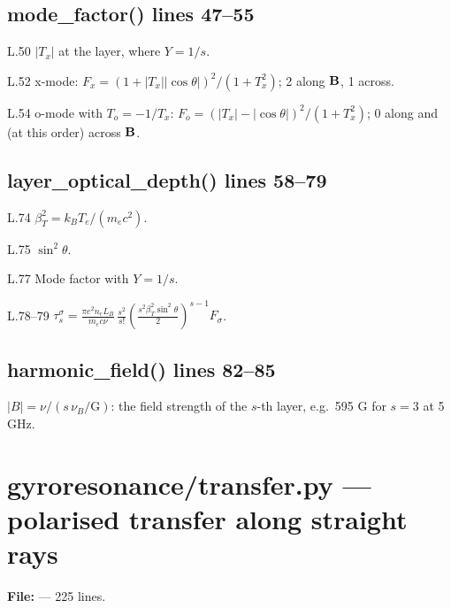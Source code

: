 \section*{\normalsize mode\_factor() \hfill{\small\mdseries\color{gray}lines 47--55}}

\begin{lines}
\item[L.50] $|T_x|$ at the layer, where $Y=1/s$.
\item[L.52] x-mode: $F_x=(1+|T_x||\cos\theta|)^2/(1+T_x^2)$; 2 along $\mathbf{B}$, 1 across.
\item[L.54] o-mode with $T_o=-1/T_x$: $F_o=(|T_x|-|\cos\theta|)^2/(1+T_x^2)$; 0 along and (at this order) across $\mathbf{B}$.
\end{lines}
\section*{\normalsize layer\_optical\_depth() \hfill{\small\mdseries\color{gray}lines 58--79}}

\begin{lines}
\item[L.74] $\beta_T^2=k_BT_e/(m_ec^2)$.
\item[L.75] $\sin^2\theta$.
\item[L.77] Mode factor with $Y=1/s$.
\item[L.78–79] $\tau_s^\sigma=\frac{\pi e^2n_eL_B}{m_ec\nu}\,\frac{s^2}{s!}\left(\frac{s^2\beta_T^2\sin^2\theta}{2}\right)^{s-1}F_\sigma$.
\end{lines}
\section*{\normalsize harmonic\_field() \hfill{\small\mdseries\color{gray}lines 82--85}}

$|B|=\nu/(s\,\nu_B/\text{G})$: the field strength of the $s$-th layer, e.g.\ 595 G for $s=3$ at 5 GHz.


\chapter{gyroresonance/transfer.py --- polarised transfer along straight rays}
\label{mod:gyroresonance:transfer.py}
\textbf{File:}  --- 225 lines.

